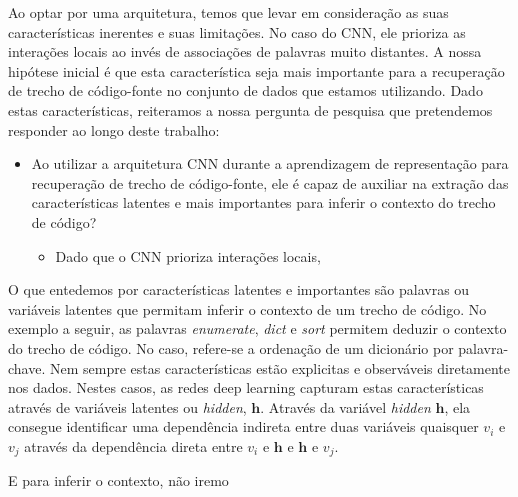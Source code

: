 Ao optar por uma arquitetura, temos que levar em consideração as suas características inerentes e suas limitações. No caso do CNN, ele prioriza as interações locais ao invés de associações de palavras muito distantes. A nossa hipótese inicial é que esta característica seja mais importante para a recuperação de trecho de código-fonte no conjunto de dados que estamos utilizando. Dado estas características, reiteramos a nossa pergunta de pesquisa que pretendemos responder ao longo deste trabalho:

\begin{itemize}
    \item Ao utilizar a arquitetura CNN durante a aprendizagem de representação para recuperação de trecho de código-fonte, ele é capaz de auxiliar na extração das características latentes e mais importantes para inferir o contexto do trecho de código?
    \begin{itemize}
        \item Dado que o CNN prioriza interações locais, 
    \end{itemize}
\end{itemize}

O que entedemos por características latentes e importantes são palavras ou variáveis latentes que permitam inferir o contexto de um trecho de código. No exemplo a seguir, as palavras \emph{enumerate}, \emph{dict} e \emph{sort} permitem deduzir o contexto do trecho de código. No caso, refere-se a ordenação de um dicionário por palavra-chave. Nem sempre estas características estão explicitas e observáveis diretamente nos dados. Nestes casos, as redes deep learning capturam estas características através de variáveis latentes ou \textit{hidden}, $\bm{h}$. Através da variável \textit{hidden} $\bm{h}$, ela consegue identificar uma dependência indireta entre duas variáveis quaisquer $v_{i}$ e $v_{j}$ através da dependência direta entre $v_{i}$ e $\bm{h}$ e $\bm{h}$ e $v_{j}$.

E para inferir o contexto, não iremo

